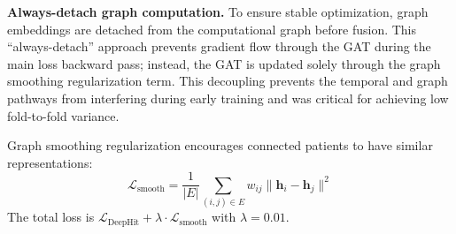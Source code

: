 \textbf{Always-detach graph computation.} To ensure stable optimization, graph embeddings are detached from the computational graph before fusion. This ``always-detach'' approach prevents gradient flow through the GAT during the main loss backward pass; instead, the GAT is updated solely through the graph smoothing regularization term. This decoupling prevents the temporal and graph pathways from interfering during early training and was critical for achieving low fold-to-fold variance.

Graph smoothing regularization encourages connected patients to have similar representations:
\begin{equation}
    \mathcal{L}_\text{smooth} = \frac{1}{|E|}\sum_{(i,j) \in E} w_{ij} \|\mathbf{h}_i - \mathbf{h}_j\|^2
\end{equation}
The total loss is $\mathcal{L}_\text{DeepHit} + \lambda \cdot \mathcal{L}_\text{smooth}$ with $\lambda{=}0.01$.

